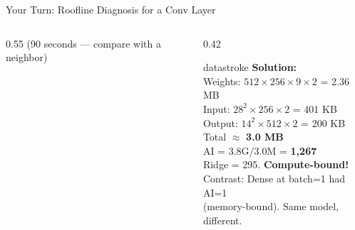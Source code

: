 \documentclass[aspectratio=169, 12pt]{beamer}
\begin{document}
\begin{frame}{Your Turn: Roofline Diagnosis for a Conv Layer}
\begin{columns}[T]
\begin{column}{0.55\textwidth}
    {\scriptsize\textcolor{midgray}{(90 seconds --- compare with a neighbor)}}
  \end{column}
  \begin{column}{0.42\textwidth}
    \pause
    \begin{mlsyscard}{datastroke}
    {\scriptsize \textbf{Solution:}\\[0.05cm]
    Weights: $512\!\times\!256\!\times\!9\!\times\!2$ = 2.36 MB\\
    Input: $28^2\!\times\!256\!\times\!2$ = 401 KB\\
    Output: $14^2\!\times\!512\!\times\!2$ = 200 KB\\
    Total $\approx$ \textbf{3.0 MB}\\[0.05cm]
    AI = $3.8\text{G} / 3.0\text{M}$ = \textbf{1,267}\\[0.05cm]
    Ridge = 295. \textcolor{computestroke}{\textbf{Compute-bound!}}\\[0.05cm]
    Contrast: Dense at batch=1 had AI=1\\
    (memory-bound). Same model, different.
    }
    \end{mlsyscard}
  \end{column}
\end{columns}

\end{frame}
\end{document}
